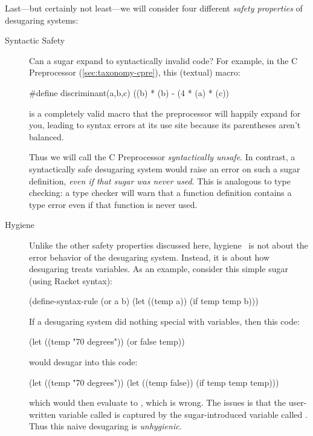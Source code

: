 Last---but certainly not least---we will consider four different
\emph{safety properties} of desugaring systems:
\begin{description}
  \item[Syntactic Safety] Can a sugar expand to syntactically invalid
    code? For example, in the C Preprocessor (\cref{sec:taxonomy-cpre}), this
    (textual) macro:
\begin{CorrectlyIndentedCodes}
#define discriminant(a,b,c) ((b) * (b) - (4 * (a) * (c))
\end{CorrectlyIndentedCodes}
    is a completely valid macro that the preprocessor will happily
    expand for you, leading to syntax errors at its use site because
    its parentheses aren't balanced.

    Thus we will call the C Preprocessor \emph{syntactically unsafe}.
    In contrast, a syntactically safe desugaring system would raise an
    error on such a sugar definition, \emph{even if that sugar was
      never used}. This is analogous to type checking: a type checker
    will warn that a function definition contains a type error even
    if that function is never used.
  \item[Hygiene] Unlike the other safety properties discussed here,
    hygiene~\cite{hygienic-macros} is not about the error behavior of the desugaring
    system.  Instead, it is about how desugaring treats variables. As
    an example, consider this simple  sugar (using Racket
    syntax):
\begin{CorrectlyIndentedCodes}
(define-syntax-rule
  (or a b)
  (let ((temp a)) (if temp temp b)))
\end{CorrectlyIndentedCodes}
    If a desugaring system did nothing special with variables, then
    this code:
\begin{CorrectlyIndentedCodes}
(let ((temp "70 degrees"))
  (or false temp))
\end{CorrectlyIndentedCodes}
    would desugar into this code:
\begin{CorrectlyIndentedCodes}
(let ((temp "70 degrees"))
  (let ((temp false)) (if temp temp temp)))
\end{CorrectlyIndentedCodes}
    which would then evaluate to , which is wrong. The
    issues is that the user-written variable called  is
    captured by the sugar-introduced variable called .
    Thus this naive desugaring is \emph{unhygienic}.
    

\end{description}
